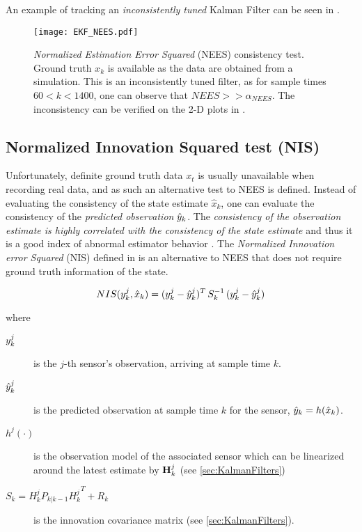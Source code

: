An example of tracking an \emph{inconsistently tuned} Kalman Filter can be seen in .
\begin{figure}[H]
	\centering
	\texttt{[image: EKF\_NEES.pdf]}
	\caption{\emph{Normalized Estimation Error Squared} (NEES) consistency test. Ground truth $x_k$ is available as the data are obtained from a simulation. This is an inconsistently tuned filter, as for sample times $60<k<1400$, one can observe that $NEES>> \alpha_{NEES}$. The inconsistency can be verified on the 2-D plots in .}
	\label{fig:ekfnees}
\end{figure}



\subsection{Normalized Innovation Squared test (NIS)}\label{ssec:NIS}
Unfortunately, definite ground truth data $x_t$ is usually unavailable when recording real data, and as such an alternative test to NEES is defined. Instead of evaluating the consistency of the state estimate $\hat{x}_k$, one can evaluate the consistency of the \emph{predicted observation} ${\hat{{y}}}_k$. The \emph{consistency of the observation estimate is highly correlated with the consistency of the state estimate} and thus it is a good index of abnormal estimator behavior \cite{Ivanov2014}. The \emph{Normalized Innovation error Squared} (NIS) defined in  is an alternative to NEES that does not require ground truth information of the state.



\begin{framed}
	
\begin{equation}\label{eq:NIS}
NIS({y}^j_k,\hat{x}_k) = ({{y}}^j_k - {{\hat{{y}}}}^j_k)^T \, S_k^{-1} \, ({{y}}^j_k - {{\hat{{y}}}}^j_k)
\end{equation}

where

\begin{description}
	\item[$ {y}^j_k $] is the $j$-th sensor's observation, arriving at sample time $k$.
	\item[$ {\hat{{y}}}^j_k $] is the predicted observation at sample time $k$ for the  sensor, \ie $ {\hat{{y}}}_k =  h(\hat{x}_k)$.
	\item[$h^j(\cdot)$] is the observation model of the associated sensor which can be linearized around the latest estimate by $\mathbf{H}^j_k$ (see \cref{sec:KalmanFilters})
	\item[$S_k = H^j_k P_{k|k-1} {H^j_k}^T + R_k$] is the innovation covariance matrix (see \cref{sec:KalmanFilters}).
\end{description}
\end{framed}


